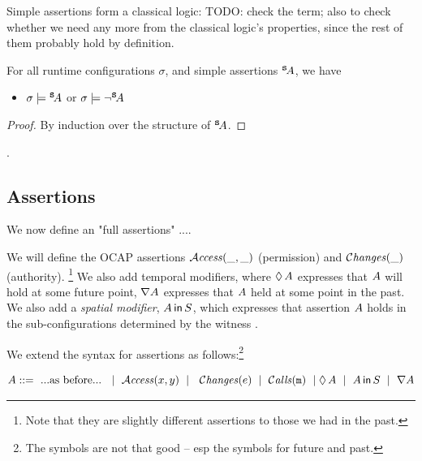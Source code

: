 Simple assertions form a classical logic: TODO: check the term; also to check whether we need any more from the classical logic's properties, since the rest of them probably hold by definition.

\begin{lemma}
For all runtime configurations $\sigma$, and simple assertions ${^{\small{{\mbox{\tt{s}}}}}\! A}$, we have
\begin{itemize}
\item
$\sigma \models {^{\small{{\mbox{\tt{s}}}}}\! A}$ or $\sigma \models \neg{^{\small{{\mbox{\tt{s}}}}}\! A}$
\end{itemize}
\end{lemma}
\begin{proof} By induction over the structure of ${^{\small{{\mbox{\tt{s}}}}}\! A}$. \end{proof}.
 
 \subsection{Assertions}

We now define an "full assertions" ....

We will define the OCAP assertions ${\mathcal{A}}\textrm{\textit{ccess}}(\_,\_)$  (permission)
and   $\mathcal{C}\textrm{\textit{hanges}}(\_)$ (authority). \footnote{Note that they are slightly different
assertions to those we had in the past.}
We also add temporal modifiers, where $\lozenge\, A$ expresses that $A$ will hold at some future point,
$\nabla A$ expresses that $A$ held at some point in the past.
We also add a {\em spatial modifier}, $A\,{\bf{\sf {in}}}\, S$, which expresses that assertion $A$ holds in
the sub-configurations determined by the witness .

We extend the syntax for assertions as follows:\footnote{The symbols are not that good -- esp the symbols for future and past.}

\begin{definition}[Assertions]
$$\A ::=\  ... \mbox{as before} ...\ \ \mid \ \CanAccess x y \ \mid\  \ \Changes e \ \mid\  \Calls{m} \ \mid\  \\ \Future \A \ \mid \ \Using \A S  \ \mid \  \Past \A$$
\end{definition}\M



